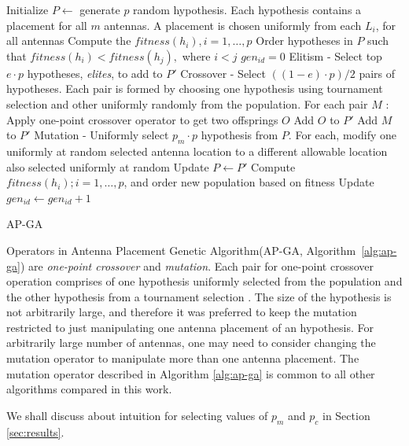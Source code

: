 \documentclass{sig-alternate}
\begin{document}
\begin{algorithm}[!ht]
 Initialize $P\leftarrow$ generate $p$ random hypothesis. Each hypothesis contains a placement for all $m$ antennas. A placement is chosen uniformly from each $L_i$, for all antennas \;
 Compute the $fitness(h_i), i=1,\ldots, p$ \;
 Order hypotheses in $P$ such that $fitness(h_i) < fitness(h_j),$ where $i<j$ \;
 $gen_{id}=0$ \;
  {
 Elitism - Select top $e\cdot p$ hypotheses, \textit{elites}, to add to $P'$ \;
 Crossover - Select $((1 - e)\cdot p)/2$ pairs of hypotheses. Each pair is formed by choosing one hypothesis using tournament selection and other uniformly randomly from the population. For each pair $M$ : \;
  {
     Apply one-point crossover operator to get two offsprings $O$ \;
     Add $O$ to $P'$ \;
 }
 { Add $M$ to $P'$ \; } 
 Mutation - Uniformly select $p_{m} \cdot p$ hypothesis from $P$. For each, modify one uniformly at random selected antenna location to a different allowable location also selected uniformly at random \;
 Update $P\leftarrow P'$ \;
 Compute $fitness(h_i); i=1,\ldots, p$, and order new population based on fitness \;
 Update $gen_{id} \leftarrow gen_{id}+1$ \;
 }
 \caption{AP-GA}
 \label{alg:ap-ga}
\end{algorithm}

Operators in Antenna Placement Genetic Algorithm(AP-GA, Algorithm~\ref{alg:ap-ga}) are \textit{one-point crossover} and \textit{mutation}. Each pair for one-point crossover operation comprises of one hypothesis uniformly selected from the population and the other hypothesis from a tournament selection \cite{miller1995genetic}. The size of the hypothesis is not arbitrarily large, and therefore it was preferred to keep the mutation restricted to just manipulating one antenna placement of an hypothesis. For arbitrarily large number of antennas, one may need to consider changing the mutation operator to manipulate more than one antenna placement. The mutation operator described in Algorithm \ref{alg:ap-ga} is common to all other algorithms compared in this work. 

We shall discuss about intuition for selecting values of $p_m$ and $p_c$ in Section \ref{sec:results}. 
\end{document}
